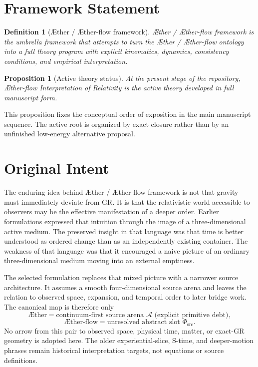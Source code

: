 \documentclass[11pt]{article}
\newcommand{\Aether}{\AE{}ther}
\newcommand{\Aflow}{\AE{}ther-flow}
\newcommand{\TheoryName}{\Aflow{} Interpretation of Relativity}
\newcommand{\TheoryProgram}{\Aether{} / \Aflow{} framework}
\newcommand{\Sub}{\mathcal{A}}
\newcommand{\PhiSrc}{\Phi_{\mathrm{src}}}
\newtheorem{definition}{Definition}
\newtheorem{proposition}{Proposition}
\begin{document}
\section{Framework Statement}

\begin{definition}[\TheoryProgram{}]
\TheoryProgram{} is the umbrella framework that attempts to turn the \Aether{} / \Aflow{} ontology into a full theory program with explicit kinematics, dynamics, consistency conditions, and empirical interpretation.
\end{definition}

\begin{proposition}[Active theory status]
At the present stage of the repository, \TheoryName{} is the active theory developed in full manuscript form.
\end{proposition}

This proposition fixes the conceptual order of exposition in the main manuscript sequence. The active root is organized by exact closure rather than by an unfinished low-energy alternative proposal.

\section{Original Intent}

The enduring idea behind \TheoryProgram{} is not that gravity must immediately deviate from GR. It is that the relativistic world accessible to observers may be the effective manifestation of a deeper order. Earlier formulations expressed that intuition through the image of a three-dimensional active medium. The preserved insight in that language was that time is better understood as ordered change than as an independently existing container. The weakness of that language was that it encouraged a naive picture of an ordinary three-dimensional medium moving into an external emptiness.

The selected formulation replaces that mixed picture with a narrower source architecture. It assumes a smooth four-dimensional source arena and leaves the relation to observed space, expansion, and temporal order to later bridge work. The canonical map is therefore only
\[
\text{\Aether{}}
=
\text{continuum-first source arena } \Sub
\text{ (explicit primitive debt)},
\]
\[
\text{\Aflow{}}
=
\text{unresolved abstract slot } \PhiSrc.
\]
No arrow from this pair to observed space, physical time, matter, or exact-GR
geometry is adopted here. The older experiential-slice, S-time, and
deeper-motion phrases remain historical interpretation targets, not equations
or source definitions.
\end{document}
